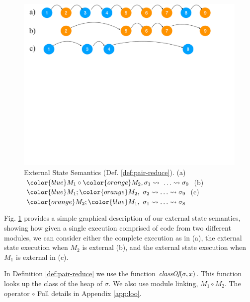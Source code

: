 \begin{figure}[htb]
  \vspace*{-2.5mm}
  \begin{center}
   \begin{minipage}{0.80\textwidth}
     \begin{center}
       \includegraphics[width=\linewidth]{diagrams/VisibleStates.pdf}
     \end{center}
   \end{minipage}
   \end{center}
   \vspace*{-2.5mm}
   \caption{External State Semantics
     (Def. \ref{def:pair-reduce}). %
     (a) $\exec{{\color{blue}M_1} \circ {\color{orange}M_2}}{\sigma_1}{\ldots}\leadsto \sigma_9$
     (b) $\reduction{{\color{blue}M_1}}{{\color{orange}M_2}}{\sigma_2}{\ldots}\leadsto \sigma_9$
     (c) $\reduction{{\color{orange}M_2}}{{\color{blue}M_1}}{\sigma_1}{\ldots}\leadsto \sigma_8$
    }
   \label{fig:VisibleStates}
 \end{figure}
 
Fig. \ref{fig:VisibleStates} provides a simple graphical description of 
our external state semantics, showing how given a single execution 
comprised of code from two different modules, we can consider either
the complete execution as in (a), the external state execution when $M_2$ is external (b), and the external state execution when $M_1$ is external  in (c).
 



In Definition \ref{def:pair-reduce}  %
we  use  the function
$\textit{classOf}(\sigma, x)$. This function looks up 
the class of   the  heap of $\sigma$. 
We also use module linking, $M_1\circ M_2$. The operator $\circ$
Full details in  Appendix \ref{app:loo}.


